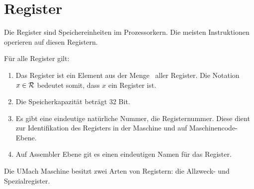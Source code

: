 \section{Register}
\label{sec:Register}

Die Register sind Speichereinheiten im Prozessorkern. Die meisten Instruktionen
operieren auf diesen Registern.

Für alle Register gilt:
\begin{enumerate}
  \item Das Register ist ein Element aus der Menge \Reg\ aller Register.
        \index{\Reg}
    Die Notation $x \in \mathcal{R}$ bedeutet somit, dass $x$ ein Register ist.
  \item Die Speicherkapazität beträgt 32 Bit.
  \item Es gibt eine eindeutige natürliche Nummer, die Registernummer.
     Diese dient zur
    Identifikation des Registers in der Maschine und auf Maschinencode-Ebene.
  \item Auf Assembler Ebene git es einen eindeutigen Namen für das Register.
\end{enumerate}

Die UMach Maschine besitzt zwei Arten von Registern: die Allzweck- und
Spezialregister.





